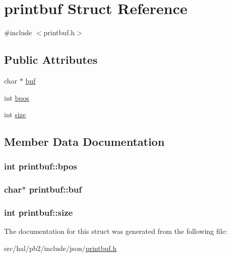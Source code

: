 \hypertarget{structprintbuf}{}\section{printbuf Struct Reference}
\label{structprintbuf}


{\ttfamily \#include $<$printbuf.\+h$>$}

\subsection*{Public Attributes}
\begin{DoxyCompactItemize}
\item 
char $\ast$ \hyperlink{structprintbuf_a5d7cf8ac260f1f7c50fecaf9bd7bc651}{buf}
\item 
int \hyperlink{structprintbuf_aba980ad7406329e32f557dfa0eb7b1b2}{bpos}
\item 
int \hyperlink{structprintbuf_a12ce6440eaa06a55b96ebdc5a9778dd5}{size}
\end{DoxyCompactItemize}


\subsection{Member Data Documentation}
\subsubsection[{\texorpdfstring{bpos}{bpos}}]{\setlength{\rightskip}{0pt plus 5cm}int printbuf\+::bpos}\hypertarget{structprintbuf_aba980ad7406329e32f557dfa0eb7b1b2}{}\label{structprintbuf_aba980ad7406329e32f557dfa0eb7b1b2}
\subsubsection[{\texorpdfstring{buf}{buf}}]{\setlength{\rightskip}{0pt plus 5cm}char$\ast$ printbuf\+::buf}\hypertarget{structprintbuf_a5d7cf8ac260f1f7c50fecaf9bd7bc651}{}\label{structprintbuf_a5d7cf8ac260f1f7c50fecaf9bd7bc651}
\subsubsection[{\texorpdfstring{size}{size}}]{\setlength{\rightskip}{0pt plus 5cm}int printbuf\+::size}\hypertarget{structprintbuf_a12ce6440eaa06a55b96ebdc5a9778dd5}{}\label{structprintbuf_a12ce6440eaa06a55b96ebdc5a9778dd5}


The documentation for this struct was generated from the following file\+:\begin{DoxyCompactItemize}
\item 
src/hal/pb2/include/json/\hyperlink{printbuf_8h}{printbuf.\+h}\end{DoxyCompactItemize}

